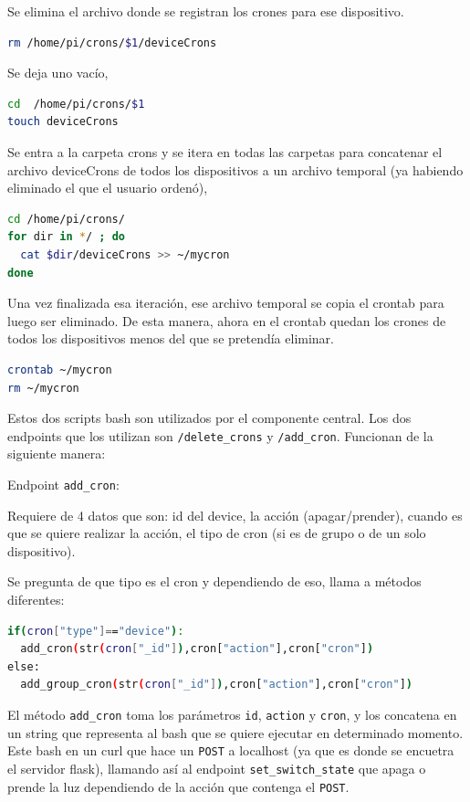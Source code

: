 Se elimina el archivo donde se registran los crones para ese dispositivo.
\begin{lstlisting}[language=bash]
rm /home/pi/crons/$1/deviceCrons
\end{lstlisting}

Se deja uno vacío,
\begin{lstlisting}[language=bash]
cd  /home/pi/crons/$1
touch deviceCrons
\end{lstlisting}

Se entra a la carpeta crons y se itera en todas las carpetas para concatenar  el archivo deviceCrons de todos los dispositivos a un archivo temporal (ya habiendo eliminado el que el usuario ordenó),

\begin{lstlisting}[language=bash]
cd /home/pi/crons/
for dir in */ ; do
  cat $dir/deviceCrons >> ~/mycron
done 
\end{lstlisting}

Una vez finalizada esa iteración,  ese archivo temporal se copia el crontab para luego ser eliminado. De esta manera, ahora en el crontab quedan los crones de todos los dispositivos menos del que se pretendía eliminar.

\begin{lstlisting}[language=bash]
crontab ~/mycron
rm ~/mycron
\end{lstlisting}

Estos dos scripts bash son utilizados por el componente central. Los dos endpoints que los utilizan son \lstinline[columns=fixed]{/delete_crons} y \lstinline[columns=fixed]{/add_cron}. Funcionan de la siguiente manera:

Endpoint \lstinline[columns=fixed]{add_cron}:

Requiere de 4 datos que son: id del device, la acción (apagar/prender), cuando es que se quiere realizar la acción, el tipo de cron (si es de grupo o de un solo dispositivo).

Se pregunta de que tipo es el cron y dependiendo de eso, llama a métodos diferentes:

\begin{lstlisting}[language=bash]
if(cron["type"]=="device"):
  add_cron(str(cron["_id"]),cron["action"],cron["cron"])
else:
  add_group_cron(str(cron["_id"]),cron["action"],cron["cron"])
\end{lstlisting}

El método \lstinline[columns=fixed]{add_cron} toma los parámetros \lstinline[columns=fixed]{id}, \lstinline[columns=fixed]{action} y \lstinline[columns=fixed]{cron}, y los concatena en un string que representa al bash que se quiere ejecutar en determinado momento. Este bash en un curl que hace un \lstinline[columns=fixed]{POST} a localhost (ya que es donde se encuetra el servidor flask), llamando así al endpoint \lstinline[columns=fixed]{set_switch_state} que apaga o prende la luz dependiendo de la acción que contenga el \lstinline[columns=fixed]{POST}.

